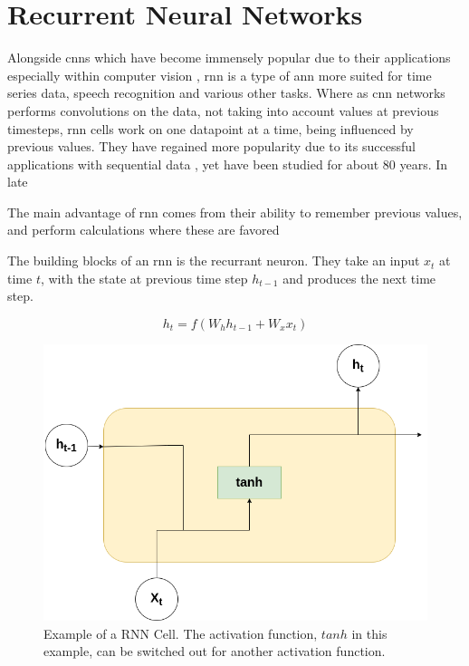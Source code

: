 \section{Recurrent Neural Networks}
\label{back:rnn}

Alongside \acrshort{cnn}s which have become immensely popular due to their applications especially within computer vision \cite{oshea2015introduction}, \acrfull{rnn} is a type of \acrfull{ann} more suited for time series data, speech recognition and various other tasks. Where as \acrfull{cnn} networks performs convolutions on the data, not taking into account values at previous timesteps, \acrshort{rnn} cells work on one datapoint at a time, being influenced by previous values.
 They have regained more popularity due to its successful applications with sequential data \cite{karpathy2015visualizing}, yet have been studied for about 80 years. In late

The main advantage of \acrshort{rnn} comes from their ability to remember previous values, and perform calculations where these are favored

The building blocks of an \acrshort{rnn} is the recurrant neuron. They take an input $x_t$ at time $t$, with the state at previous time step $h_{t-1}$ and produces the next time step. 


\begin{equation}
    h_t = f(W_hh_{t-1}+W_xx_t)
\end{equation}

\begin{figure}[h]
    \centering
    \includegraphics[scale=0.4]{figures/rnn.drawio.png}
    \caption{Example of a RNN Cell. The activation function, $tanh$ in this example, can be switched out for another activation function.}
    \label{fig:rnncell}
\end{figure}


